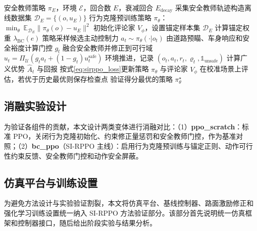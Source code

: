 \begin{algorithm}[htbp]
\caption{安全教师门控与动作可行性约束反馈的 PPO（SI-RPPO）}
\label{alg:sirppo}
\begin{algorithmic}[1]
\Require 安全教师策略 $\pi_E$，环境 $\mathcal E$，回合数 $E$，衰减回合 $E_{\mathrm{decay}}$
\State 采集安全教师轨迹构造离线数据集 $\mathcal D_E=\{(o,u_E)\}$
\State 行为克隆预训练策略 $\pi_\theta$：$\min_\theta\ \mathbb E_{\mathcal D_E}\|\pi_\theta(o)-u_E\|^2$
\State 初始化评论家 $V_\phi$，设置锚定样本集 $\mathcal D_E$
  \State 计算锚定权重 $\lambda_{\mathrm{BC}}(e)$ 
    \State 策略采样候选主动控制力 $a_t\sim\pi_\theta(\cdot|o_t)$
    \State 由道路预瞄、车身响应和安全裕度计算门控 $g_t$ 
    \State 融合安全教师并修正到可行域 $u_t=\Pi_{\mathcal U}(g_ta_t+(1-g_t)u_t^{\mathrm{safe}})$ 
    \State 环境推进，记录 $(o_t,a_t,r_t,\varrho_t,\mathbb 1_{\mathrm{unsafe}})$
  \EndFor
  \State 计算广义优势 $\hat A_t$ 与回报
  \State 按式\eqref{eq:sirppo_loss}更新策略 $\pi_\theta$ 与评论家 $V_\phi$
  \State 在校准场景上评估，若优于历史最优则保存检查点
\EndFor
\State \Return 验证得分最优的策略 $\pi_\theta^\star$
\end{algorithmic}
\end{algorithm}

\subsection{消融实验设计}
为验证各组件的贡献，本文设计两类变体进行消融对比：（1）\textbf{ppo\_scratch}：标准 PPO，关闭行为克隆初始化、约束修正量惩罚和安全教师门控，作为基准对照；（2）\textbf{bc\_ppo}（SI-RPPO 主线）：启用行为克隆预训练与锚定正则、动作可行性约束反馈、安全教师门控和动作安全屏蔽。

\subsection{仿真平台与训练设置}
\label{sec:sirppo_sim_setup}
为避免方法设计与实验验证割裂，本文将仿真平台、基线控制器、路面激励修正和强化学习训练设置统一纳入 SI-RPPO 方法验证部分。该部分首先说明统一仿真框架和控制器接口，随后给出阶段实验与结果分析。

